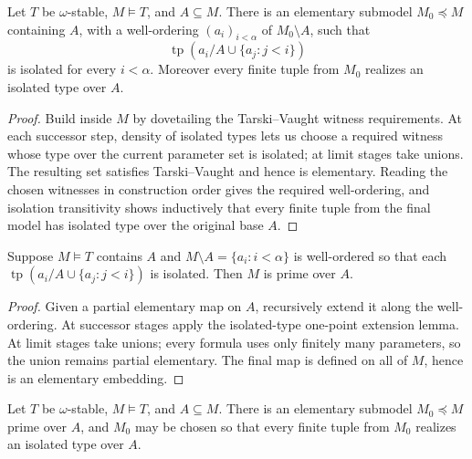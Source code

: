 \begin{lemma}
\label{lem:isolated-elementary-submodel-over-set}
Let \(T\) be \(\omega\)-stable, \(M\models T\), and \(A\subseteq M\).
There is an elementary submodel \(M_0\preceq M\) containing \(A\), with
a well-ordering \((a_i)_{i<\alpha}\) of \(M_0\setminus A\), such that
\[
  \operatorname{tp}(a_i/A\cup\{a_j:j<i\})
\]
is isolated for every \(i<\alpha\).  Moreover every finite tuple from
\(M_0\) realizes an isolated type over \(A\).
\end{lemma}

\begin{proof}
Build inside \(M\) by dovetailing the Tarski--Vaught witness
requirements.  At each successor step, density of isolated types lets us
choose a required witness whose type over the current parameter set is
isolated; at limit stages take unions.  The resulting set satisfies
Tarski--Vaught and hence is elementary.  Reading the chosen witnesses in
construction order gives the required well-ordering, and isolation
transitivity shows inductively that every finite tuple from the final
model has isolated type over the original base \(A\).
\end{proof}

\begin{lemma}
\label{lem:isolated-construction-prime}
Suppose \(M\models T\) contains \(A\) and
\(M\setminus A=\{a_i:i<\alpha\}\) is well-ordered so that each
\(\operatorname{tp}(a_i/A\cup\{a_j:j<i\})\) is isolated.  Then \(M\)
is prime over \(A\).
\end{lemma}

\begin{proof}
Given a partial elementary map on \(A\), recursively extend it along the
well-ordering.  At successor stages apply the isolated-type one-point
extension lemma.  At limit stages take unions; every formula uses only
finitely many parameters, so the union remains partial elementary.  The
final map is defined on all of \(M\), hence is an elementary embedding.
\end{proof}

\begin{theorem}
\label{thm:prime-extension-over-set}
Let \(T\) be \(\omega\)-stable, \(M\models T\), and \(A\subseteq M\).
There is an elementary submodel \(M_0\preceq M\) prime over \(A\), and
\(M_0\) may be chosen so that every finite tuple from \(M_0\) realizes
an isolated type over \(A\).
\end{theorem}

